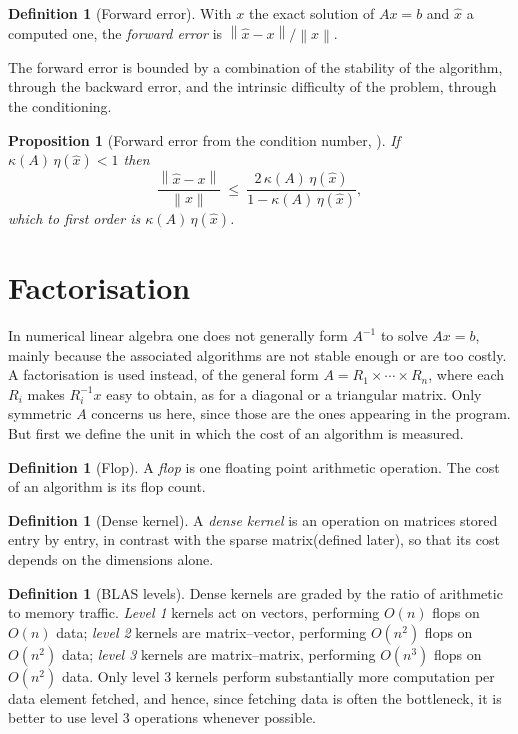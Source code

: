 \documentclass[a4paper,11pt]{book}
\theoremstyle{plain}
\newtheorem{proposition}[theorem]{Proposition}
\theoremstyle{definition}
\newtheorem{definition}[theorem]{Definition}
\theoremstyle{remark}
\numberwithin{equation}{chapter}
\numberwithin{algorithm}{chapter}
\newcommand{\norm}[1]{\left\|#1\right\|}
\begin{document}
	\begin{definition}[Forward error]
		With $x$ the exact solution of $Ax=b$ and $\hat x$ a computed one, the
		\emph{forward error} is $\norm{\hat x-x}/\norm{x}$.
	\end{definition}
	
	The forward error is bounded by a combination of the stability of the
	algorithm, through the backward error, and the intrinsic difficulty of the
	problem, through the conditioning.
	\begin{proposition}[Forward error from the condition number, \cite{Higham2002}]
		If $\kappa(A)\,\eta(\hat x)<1$ then
		\begin{equation}
			\frac{\norm{\hat x-x}}{\norm{x}}
			\ \leq\ \frac{2\,\kappa(A)\,\eta(\hat x)}{1-\kappa(A)\,\eta(\hat x)} ,
		\end{equation}
		which to first order is $\kappa(A)\,\eta(\hat x)$.
	\end{proposition}
	
	\section{Factorisation}
	
	In numerical linear algebra one does not generally form $A^{-1}$ to solve
	$Ax=b$, mainly because the associated algorithms are not stable enough or are
	too costly. A factorisation is used instead, of the general form
	$A=R_1\times\cdots\times R_n$, where each $R_i$ makes $R_i^{-1}x$ easy to
	obtain, as for a diagonal or a triangular matrix. Only symmetric $A$ concerns
	us here, since those are the ones appearing in the program. But first we define
	the unit in which the cost of an algorithm is measured.
	
	\begin{definition}[Flop]
		A \emph{flop} is one floating point arithmetic operation. The cost of an
		algorithm is its flop count.
	\end{definition}
	
	
	\begin{definition}[Dense kernel]
		A \emph{dense kernel} is an operation on matrices stored entry by entry, in
		contrast with the sparse matrix(defined later), so that its cost depends on the dimensions
		alone.
	\end{definition}
	
	
	\begin{definition}[BLAS levels]\label{def:blaslevels}
		Dense kernels are graded by the ratio of arithmetic to memory traffic.
		\emph{Level 1} kernels act on vectors, performing $O(n)$ flops on $O(n)$ data;
		\emph{level 2} kernels are matrix--vector, performing $O(n^2)$ flops on
		$O(n^2)$ data; \emph{level 3} kernels are matrix--matrix, performing $O(n^3)$
		flops on $O(n^2)$ data. Only level 3 kernels perform substantially more
		computation per data element fetched, and hence, since fetching data is often
		the bottleneck, it is better to use level 3 operations whenever possible.
	\end{definition}
	
\end{document}
